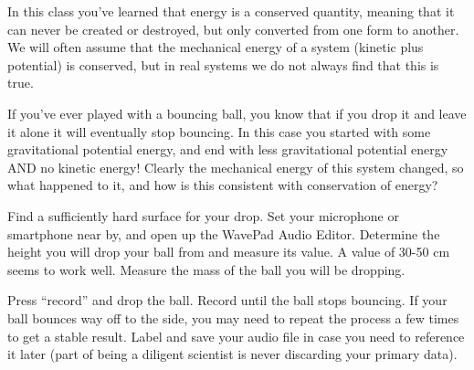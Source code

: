 \renewcommand\thechapter{c1.8a}
\label{lab:ballbounce}

\apparatus
{}


\introduction

In this class you've learned that energy is a conserved quantity, meaning that it can never be created or destroyed, but only converted from one form to another. We will often assume that the mechanical energy of a system (kinetic plus potential) is conserved, but in real systems we do not always find that this is true. 

If you've ever played with a bouncing ball, you know that if you drop it and leave it alone it will eventually stop bouncing.  In this case you started with some gravitational potential energy, and end with less gravitational potential energy AND no kinetic energy! Clearly the mechanical energy of this system changed, so what happened to it, and how is this consistent with conservation of energy?

\observations

Find a sufficiently hard surface for your drop. Set your microphone or smartphone near by, and open up the WavePad Audio Editor. Determine the height you will drop your ball from and measure its value.  A value of 30-50 cm seems to work well. Measure the mass of the ball you will be dropping.

Press ``record'' and drop the ball. Record until the ball stops bouncing.  If your ball bounces way off to the side, you may need to repeat the process a few times to get a stable result. Label and save your audio file in case you need to reference it later (part of being a diligent scientist is never discarding your primary data).  

